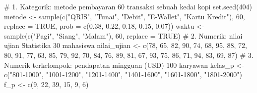 \documentclass[
  indonesian,
  letterpaper,
]{book}
\newenvironment{Shaded}{\begin{snugshade}}{\end{snugshade}}
\newcommand{\AttributeTok}[1]{\textcolor[rgb]{0.40,0.45,0.13}{#1}}
\newcommand{\CommentTok}[1]{\textcolor[rgb]{0.37,0.37,0.37}{#1}}
\newcommand{\ConstantTok}[1]{\textcolor[rgb]{0.56,0.35,0.01}{#1}}
\newcommand{\DecValTok}[1]{\textcolor[rgb]{0.68,0.00,0.00}{#1}}
\newcommand{\FloatTok}[1]{\textcolor[rgb]{0.68,0.00,0.00}{#1}}
\newcommand{\FunctionTok}[1]{\textcolor[rgb]{0.28,0.35,0.67}{#1}}
\newcommand{\NormalTok}[1]{\textcolor[rgb]{0.00,0.23,0.31}{#1}}
\newcommand{\OtherTok}[1]{\textcolor[rgb]{0.00,0.23,0.31}{#1}}
\newcommand{\StringTok}[1]{\textcolor[rgb]{0.13,0.47,0.30}{#1}}
\begin{document}
\begin{Shaded}
\begin{Highlighting}[]
\CommentTok{\# 1. Kategorik: metode pembayaran 60 transaksi sebuah kedai kopi}
\FunctionTok{set.seed}\NormalTok{(}\DecValTok{404}\NormalTok{)}
\NormalTok{metode }\OtherTok{\textless{}{-}} \FunctionTok{sample}\NormalTok{(}\FunctionTok{c}\NormalTok{(}\StringTok{"QRIS"}\NormalTok{, }\StringTok{"Tunai"}\NormalTok{, }\StringTok{"Debit"}\NormalTok{, }\StringTok{"E{-}Wallet"}\NormalTok{, }\StringTok{"Kartu Kredit"}\NormalTok{), }\DecValTok{60}\NormalTok{, }\AttributeTok{replace =} \ConstantTok{TRUE}\NormalTok{,}
\AttributeTok{prob =} \FunctionTok{c}\NormalTok{(}\FloatTok{0.38}\NormalTok{, }\FloatTok{0.22}\NormalTok{, }\FloatTok{0.18}\NormalTok{, }\FloatTok{0.15}\NormalTok{, }\FloatTok{0.07}\NormalTok{))}
\NormalTok{waktu }\OtherTok{\textless{}{-}} \FunctionTok{sample}\NormalTok{(}\FunctionTok{c}\NormalTok{(}\StringTok{"Pagi"}\NormalTok{, }\StringTok{"Siang"}\NormalTok{, }\StringTok{"Malam"}\NormalTok{), }\DecValTok{60}\NormalTok{, }\AttributeTok{replace =} \ConstantTok{TRUE}\NormalTok{)}
\CommentTok{\# 2. Numerik: nilai ujian Statistika 30 mahasiswa}
\NormalTok{nilai\_ujian }\OtherTok{\textless{}{-}} \FunctionTok{c}\NormalTok{(}\DecValTok{78}\NormalTok{, }\DecValTok{65}\NormalTok{, }\DecValTok{82}\NormalTok{, }\DecValTok{90}\NormalTok{, }\DecValTok{74}\NormalTok{, }\DecValTok{68}\NormalTok{, }\DecValTok{95}\NormalTok{, }\DecValTok{88}\NormalTok{, }\DecValTok{72}\NormalTok{, }\DecValTok{80}\NormalTok{,}
\DecValTok{91}\NormalTok{, }\DecValTok{77}\NormalTok{, }\DecValTok{63}\NormalTok{, }\DecValTok{85}\NormalTok{, }\DecValTok{79}\NormalTok{, }\DecValTok{92}\NormalTok{, }\DecValTok{70}\NormalTok{, }\DecValTok{84}\NormalTok{, }\DecValTok{76}\NormalTok{, }\DecValTok{89}\NormalTok{,}
\DecValTok{81}\NormalTok{, }\DecValTok{67}\NormalTok{, }\DecValTok{93}\NormalTok{, }\DecValTok{75}\NormalTok{, }\DecValTok{86}\NormalTok{, }\DecValTok{71}\NormalTok{, }\DecValTok{94}\NormalTok{, }\DecValTok{83}\NormalTok{, }\DecValTok{69}\NormalTok{, }\DecValTok{87}\NormalTok{)}
\CommentTok{\# 3. Numerik terkelompok: pendapatan mingguan (USD) 100 karyawan}
\NormalTok{kelas\_p }\OtherTok{\textless{}{-}} \FunctionTok{c}\NormalTok{(}\StringTok{"801{-}1000"}\NormalTok{, }\StringTok{"1001{-}1200"}\NormalTok{, }\StringTok{"1201{-}1400"}\NormalTok{, }\StringTok{"1401{-}1600"}\NormalTok{, }\StringTok{"1601{-}1800"}\NormalTok{, }\StringTok{"1801{-}2000"}\NormalTok{)}
\NormalTok{f\_p }\OtherTok{\textless{}{-}} \FunctionTok{c}\NormalTok{(}\DecValTok{9}\NormalTok{, }\DecValTok{22}\NormalTok{, }\DecValTok{39}\NormalTok{, }\DecValTok{15}\NormalTok{, }\DecValTok{9}\NormalTok{, }\DecValTok{6}\NormalTok{)}
\end{Highlighting}
\end{Shaded}
\end{document}
